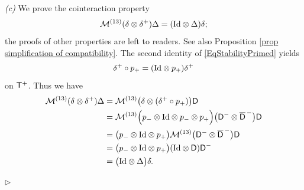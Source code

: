 \documentclass[10pt, reqno]{amsart}
\numberwithin{subsection}{section}
\numberwithin{subsubsection}{subsection}
\numberwithin{equation}{section} %
\newenvironment{Dem}[1][\unskip]{%
    \begin{list}{\hspace{1.15cm}{\sf \textbf{{\small Proof #1 --}}}}{%
        \setlength{\topsep}{0pt}%
        \setlength{\leftmargin}{0pt}%
        \setlength{\rightmargin}{0pt}%
        \setlength{\listparindent}{0pt}%
        \setlength{\itemindent}{0pt}%
        \setlength{\parsep}{0pt}%
        \addtolength{\leftmargin}{0pt}%
        \addtolength{\rightmargin}{0pt}%
    } \item }{\hfill $\rhd$\end{list}\smallskip}
\theoremstyle{mystyle}
\theoremstyle{mystyle2}
\theoremstyle{mystyle3}
\newcommand{\iden}{\text{\rm Id}}
\newcommand{\ssk}{\smallskip}
\newcommand{\mcM}{\mathcal{M}}
\begin{document}
\begin{Dem}
\ssk

\textit{\textsf{(c)}}
We prove the cointeraction property
$$
\mcM^{(13)}(\delta\otimes\delta^+)\Delta=(\iden\otimes\Delta)\delta;
$$
the proofs of other properties are left to readers. See also Proposition \ref{prop simplification of compatibility}. The second identity of \eqref{EqStabilityPrimed} yields
$$
\delta^+\circ p_+ = (\iden\otimes p_+)\delta^+
$$
on ${\sf T}^+$. Thus we have
\begin{align*}
\mcM^{(13)}(\delta\otimes\delta^+)\Delta
&=\mcM^{(13)}\big(\delta\otimes(\delta^+\circ p_+)\big){\sf D}   \\
&=\mcM^{(13)}\Big(p_-\otimes\iden\otimes p_-\otimes p_+\Big)\big({\sf D}^-\otimes\overline{\sf D}^{\,-}\big){\sf D}   \\
&=\big(p_-\otimes\iden\otimes p_+\big)\mcM^{(13)}\big({\sf D}^-\otimes\overline{\sf D}^{\,-}\big){\sf D}   \\
&=\big(p_-\otimes\iden\otimes p_+\big)(\iden\otimes{\sf D}){\sf D}^-\\
&=\big(\iden\otimes\Delta\big)\delta.
\end{align*}

\ssk


\end{Dem}
\end{document}
